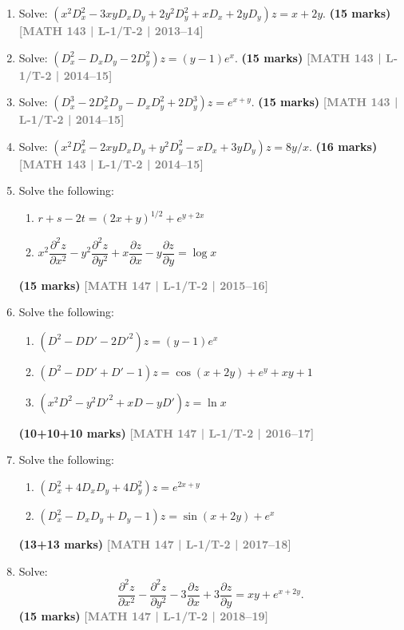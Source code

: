 \documentclass[12pt,a4paper]{article}
\newcommand{\yr}[1]{\hfill\textcolor{gray}{\small\textbf{[#1]}}}
\newcommand{\mk}[1]{\textcolor{orange!70!black}{\small\textbf{(#1 marks)}}}
\begin{document}
\begin{enumerate}
\item Solve: $(x^{2}D_{x}^{2}-3xyD_{x}D_{y}+2y^{2}D_{y}^{2}+xD_{x}+2yD_{y})z=x+2y$.
\mk{15} \yr{MATH 143 | L-1/T-2 | 2013--14}

\item Solve: $(D_{x}^{2}-D_{x}D_{y}-2D_{y}^{2})z=(y-1)e^{x}$.
\mk{15} \yr{MATH 143 | L-1/T-2 | 2014--15}

\item Solve: $(D_{x}^{3}-2D_{x}^{2}D_{y}-D_{x}D_{y}^{2}+2D_{y}^{3})z=e^{x+y}$.
\mk{15} \yr{MATH 143 | L-1/T-2 | 2014--15}

\item Solve: $(x^{2}D_{x}^{2}-2xyD_{x}D_{y}+y^{2}D_{y}^{2}-xD_{x}+3yD_{y})z=8y/x$.
\mk{16\textonehalf} \yr{MATH 143 | L-1/T-2 | 2014--15}

\item Solve the following:
\begin{enumerate}
  \item $r+s-2t=(2x+y)^{1/2}+e^{y+2x}$ \quad [where $r=z_{xx},s=z_{xy},t=z_{yy}$]
  \item $x^{2}\dfrac{\partial^{2}z}{\partial x^{2}}-y^{2}\dfrac{\partial^{2}z}{\partial y^{2}}+x\dfrac{\partial z}{\partial x}-y\dfrac{\partial z}{\partial y}=\log x$
\end{enumerate}
\mk{15} \yr{MATH 147 | L-1/T-2 | 2015--16}

\item Solve the following:
\begin{enumerate}
  \item $(D^{2}-DD'-2D'^{2})z=(y-1)e^{x}$
  \item $(D^{2}-DD'+D'-1)z=\cos(x+2y)+e^{y}+xy+1$
  \item $(x^{2}D^{2}-y^{2}D'^{2}+xD-yD')z=\ln x$
\end{enumerate}
\mk{10+10+10} \yr{MATH 147 | L-1/T-2 | 2016--17}

\item Solve the following:
\begin{enumerate}
  \item $(D_{x}^{2}+4D_{x}D_{y}+4D_{y}^{2})z=e^{2x+y}$
  \item $(D_{x}^{2}-D_{x}D_{y}+D_{y}-1)z=\sin(x+2y)+e^{x}$
\end{enumerate}
\mk{13+13} \yr{MATH 147 | L-1/T-2 | 2017--18}

\item Solve:
\[
\frac{\partial^{2}z}{\partial x^{2}}-\frac{\partial^{2}z}{\partial y^{2}}-3\frac{\partial z}{\partial x}+3\frac{\partial z}{\partial y}=xy+e^{x+2y}.
\]
\mk{15} \yr{MATH 147 | L-1/T-2 | 2018--19}


\end{enumerate}
\end{document}
